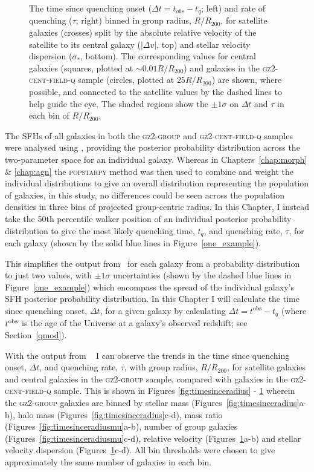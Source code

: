 \begin{figure}
{\caption[Trend of $\Delta t$ and $\tau$ with group radius split by relative velocity and stellar velocity dispersion]{The time since quenching onset ($\Delta t = t_{obs} - t_{q}$; left) and rate of quenching ($\tau$; right) binned in group radius, $R/R_{200}$, for satellite galaxies (crosses) split by the absolute relative velocity of the satellite to its central galaxy ($|\Delta v|$, top) and stellar velocity dispersion ($\sigma_*$, bottom). The corresponding values for central galaxies (squares, plotted at $\sim0.01 R/R_{200}$) and galaxies in the \textsc{gz2-cent-field-q} sample (circles, plotted at $25 R/R_{200}$) are shown, where possible, and connected to the satellite values by the dashed lines to help guide the eye. The shaded regions show the $\pm1\sigma$ on $\Delta t$ and $\tau$ in each bin of $R/R_{200}$.}
\label{fig:timesinceradiusvel}}
\end{figure}

The SFHs of all galaxies in both the \textsc{gz2-group} and \textsc{gz2-cent-field-q} samples were analysed using \starpy, providing the posterior probability distribution across the two-parameter space for an individual galaxy.  Whereas in Chapters~\ref{chap:morph} \& \ref{chap:agn} the \textsc{popstarpy} method was then used to combine and weight the individual distributions to give an overall distribution representing the population of galaxies, in this study, no differences could be seen across the population densities in three bins of projected group-centric radius. In this Chapter, I instead take the 50th percentile walker position of an individual posterior probability distribution to give the most likely quenching time, $t_{q}$, and quenching rate, $\tau$, for each galaxy (shown by the solid blue lines in Figure~\ref{one_example}).

This simplifies the output from \starpy\ for each galaxy from a probability distribution to just two values, with $\pm1\sigma$ uncertainties (shown by the dashed blue lines in Figure~\ref{one_example}) which encompass the spread of the individual galaxy's SFH posterior probability distribution. In this Chapter I will calculate the time since quenching onset, $\Delta t$, for a given galaxy by calculating {\bf $\Delta t = t^\mathrm{obs} - t_{q}$} (where $t^{\rm{obs}}$ is the age of the Universe at a galaxy's observed redshift; see Section~\ref{qmod}). 

With the output from \starpy~ I can observe the trends in the time since quenching onset, $\Delta t$, and quenching rate, $\tau$, with group radius, $R/R_{200}$, for satellite galaxies and central galaxies in the \textsc{gz2-group} sample, compared with galaxies in the \textsc{gz2-cent-field-q} sample. This is shown in Figures \ref{fig:timesinceradius} - \ref{fig:timesinceradiusvel} wherein the \textsc{gz2-group} galaxies are binned by stellar mass (Figures~\ref{fig:timesinceradius}a-b), halo mass (Figures~\ref{fig:timesinceradius}c-d), mass ratio (Figures~\ref{fig:timesinceradiusmu}a-b), number of group galaxies (Figures~\ref{fig:timesinceradiusmu}c-d), relative velocity (Figures~\ref{fig:timesinceradiusvel}a-b) and stellar velocity dispersion (Figures~\ref{fig:timesinceradiusvel}c-d). All bin thresholds were chosen to give approximately the same number of galaxies in each bin. 

